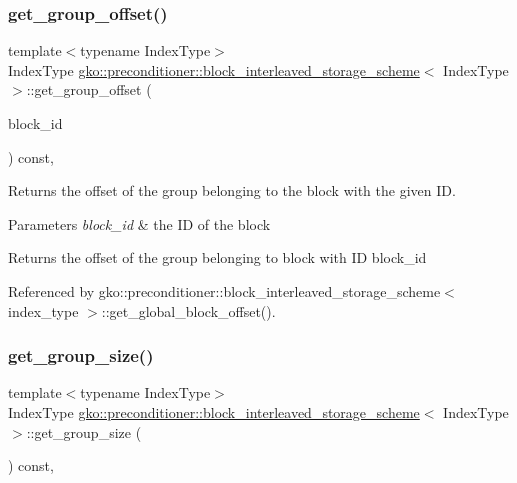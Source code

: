\subsubsection{\texorpdfstring{get\+\_\+group\+\_\+offset()}{get\_group\_offset()}}
{\footnotesize\ttfamily template$<$typename Index\+Type$>$ \\
Index\+Type \hyperlink{structgko_1_1preconditioner_1_1block__interleaved__storage__scheme}{gko\+::preconditioner\+::block\+\_\+interleaved\+\_\+storage\+\_\+scheme}$<$ Index\+Type $>$\+::get\+\_\+group\+\_\+offset (\begin{DoxyParamCaption}\item[{Index\+Type}]{block\+\_\+id }\end{DoxyParamCaption}) const\hspace{0.3cm}{\ttfamily [inline]}, {\ttfamily [noexcept]}}



Returns the offset of the group belonging to the block with the given ID. 


\begin{DoxyParams}{Parameters}
{\em block\+\_\+id} & the ID of the block\\
\hline
\end{DoxyParams}
\begin{DoxyReturn}{Returns}
the offset of the group belonging to block with ID {\ttfamily block\+\_\+id} 
\end{DoxyReturn}


Referenced by gko\+::preconditioner\+::block\+\_\+interleaved\+\_\+storage\+\_\+scheme$<$ index\+\_\+type $>$\+::get\+\_\+global\+\_\+block\+\_\+offset().

\mbox{\label{structgko_1_1preconditioner_1_1block__interleaved__storage__scheme_af5eee19f00b1cd4c378ac3410be72093}} 
\subsubsection{\texorpdfstring{get\+\_\+group\+\_\+size()}{get\_group\_size()}}
{\footnotesize\ttfamily template$<$typename Index\+Type$>$ \\
Index\+Type \hyperlink{structgko_1_1preconditioner_1_1block__interleaved__storage__scheme}{gko\+::preconditioner\+::block\+\_\+interleaved\+\_\+storage\+\_\+scheme}$<$ Index\+Type $>$\+::get\+\_\+group\+\_\+size (\begin{DoxyParamCaption}{ }\end{DoxyParamCaption}) const\hspace{0.3cm}{\ttfamily [inline]}, {\ttfamily [noexcept]}}



